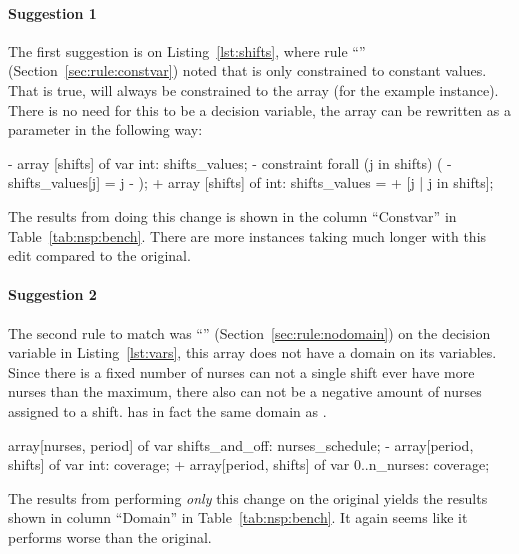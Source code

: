 \documentclass[a4paper,12pt]{article}
\newcommand{\ruleref}[1]{``\nameref{sec:rule:#1}'' (Section~\ref{sec:rule:#1})}
\begin{document}
\paragraph{Suggestion 1}
\begin{sloppypar}
The first suggestion is on Listing~\ref{lst:shifts}, where rule \ruleref{constvar} noted
that  is only constrained to constant values. That is true,
 will always be constrained to the array \mi{[1,2,3]} (for the example instance).
There is no need for this to be a decision variable, the array can be rewritten as a parameter in the following way:
\end{sloppypar}
\begin{mznnobreak}[style=diff]
- array [shifts] of var int: shifts_values;
- constraint forall (j in shifts) (
-   shifts_values[j] = j
- );
+ array [shifts] of int: shifts_values =
+   [j | j in shifts];
\end{mznnobreak}
The results from doing this change is shown in the column ``Constvar'' in
Table~\ref{tab:nsp:bench}. There are more instances taking much longer with this edit
compared to the original.

\paragraph{Suggestion 2}
The second rule to match was \ruleref{nodomain} on the decision variable  in
Listing~\ref{lst:vars}, this array does not have a domain on its variables. Since there is
a fixed number of nurses can not a single shift ever have more nurses than the maximum, there also
can not be a negative amount of nurses assigned to a shift.  has in fact the
same domain as .
\begin{mznnobreak}[style=diff]
array[nurses, period] of var shifts_and_off: nurses_schedule;
- array[period, shifts] of var int: coverage;
+ array[period, shifts] of var 0..n_nurses: coverage;
\end{mznnobreak}
The results from performing \emph{only} this change on the original yields the results
shown in column ``Domain'' in Table~\ref{tab:nsp:bench}. It again seems like it performs
worse than the original.
\end{document}
